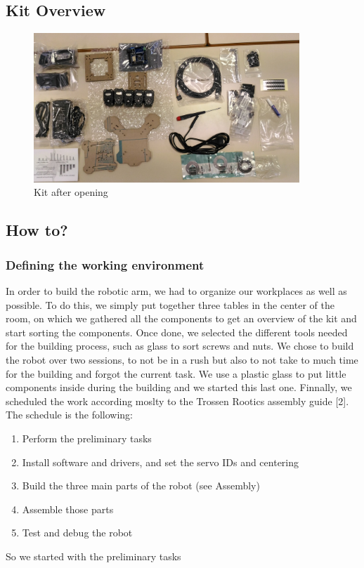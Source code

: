 \documentclass[aps,letterpaper,11pt]{revtex4}
\begin{document}
\subsection{Kit Overview}

\begin{figure}[H]
	\centering
	\includegraphics[width=10cm]{kit.jpg}
	\caption{Kit after opening}
	\label{fig:Kit}    
\end{figure}


\subsection{How to?}
\subsubsection{Defining the working environment}

In order to build the robotic arm, we had to organize our workplaces as well as possible.
To do this, we simply put together three tables in the center of the room, 
on which we gathered all the components to get an overview of the kit and start sorting the components.
Once done, we selected the different tools needed for the building process, such as glass to sort screws and nuts.
We chose to build the robot over two sessions, to not be in a rush but also to not take to much time for the building and forgot the current task.
We use a plastic glass to put little components inside during the building and we started this last one.
Finnally, we scheduled the work according moslty to the Trossen Rootics assembly guide [2]. The schedule is the following:
\begin{enumerate}
\item Perform the preliminary tasks
\item Install software and drivers, and set the servo IDs and centering
\item Build the three main parts of the robot (see Assembly)
\item Assemble those parts
\item Test and debug the robot
\end{enumerate}
So we started with the preliminary tasks
\end{document}
